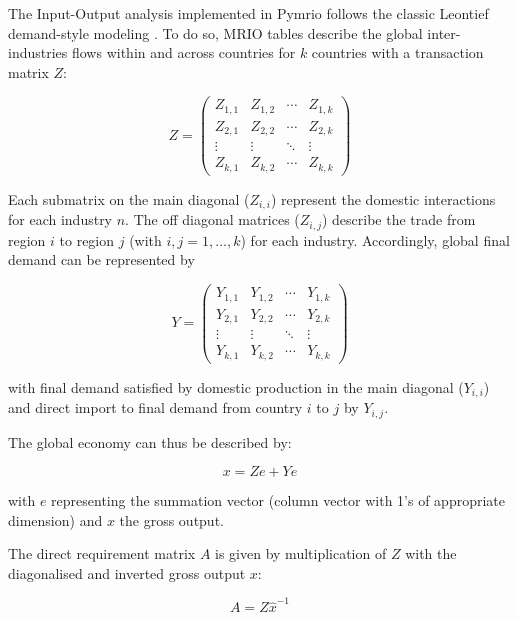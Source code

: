 \documentclass{jors}
\begin{document}
{The Input-Output analysis implemented in Pymrio follows the classic Leontief demand-style modeling  \cite{leontief1970}.
To do so, MRIO tables describe the global inter-industries flows within and across countries for $k$ countries with a transaction matrix $Z$:

\begin{equation}
    Z =
    \begin{pmatrix}
      Z_{1,1} & Z_{1,2} & \cdots & Z_{1,k} \\
      Z_{2,1} & Z_{2,2} & \cdots & Z_{2,k} \\
      \vdots  & \vdots  & \ddots & \vdots  \\
      Z_{k,1} & Z_{k,2} & \cdots & Z_{k,k}
    \end{pmatrix}
\end{equation}

Each submatrix on the main diagonal ($Z_{i,i}$) represent the domestic
interactions for each industry $n$. The off diagonal matrices ($Z_{i,j}$)
describe the trade from region $i$ to region $j$ (with $i, j = 1, \ldots, k$)
for each industry. Accordingly, global final demand can be represented by

\begin{equation}
    Y =
    \begin{pmatrix}
      Y_{1,1} & Y_{1,2} & \cdots & Y_{1,k} \\
      Y_{2,1} & Y_{2,2} & \cdots & Y_{2,k} \\
      \vdots  & \vdots  & \ddots & \vdots  \\
      Y_{k,1} & Y_{k,2} & \cdots & Y_{k,k}
    \end{pmatrix}
\end{equation}

with final demand satisfied by domestic production in the main diagonal
($Y_{i,i}$) and direct import to final demand from country $i$ to $j$ by
$Y_{i,j}$.

The global economy can thus be described by:

\begin{equation}
    x = Ze + Ye
\end{equation}

with $e$ representing the summation vector (column vector with 1's of
appropriate dimension) and $x$ the gross output.

The direct requirement matrix $A$ is given by multiplication of $Z$ with the
diagonalised and inverted gross output $x$:

\begin{equation}
    A = Z\hat{x}^{-1}
\end{equation}

}
\end{document}
